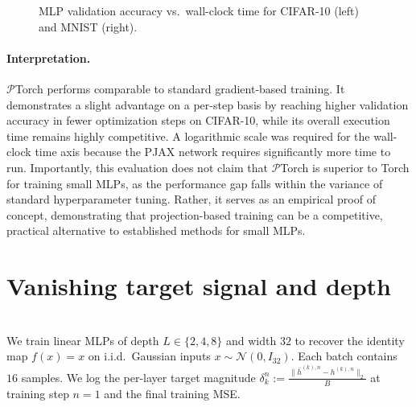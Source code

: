 \begin{figure}[ht]
\centering
\begin{minipage}[t]{0.47\textwidth}
    \centering
\end{minipage}
\hfill
\begin{minipage}[t]{0.47\textwidth}
    \centering
\end{minipage}
\caption{MLP validation accuracy vs.\ wall-clock time for CIFAR-10 (left) and MNIST (right).}
\label{fig:shallow-mlp-time}
\end{figure}

\paragraph{Interpretation.}
$\mathcal{P}$Torch performs comparable to standard gradient-based training. It demonstrates a slight advantage on a per-step basis by reaching higher validation accuracy in fewer optimization steps on CIFAR-10, while its overall execution time remains highly competitive. A logarithmic scale was required for the wall-clock time axis because the PJAX network requires significantly more time to run. Importantly, this evaluation does not claim that $\mathcal{P}$Torch is superior to Torch for training small MLPs, as the performance gap falls within the variance of standard hyperparameter tuning. Rather, it serves as an empirical proof of concept, demonstrating that projection-based training can be a competitive, practical alternative to established methods for small MLPs.%
\section{Vanishing target signal and depth}
\label{sec:exp-vanishing}
\begin{tcolorbox}[reprocard, title=Setup]\\
We train linear MLPs of depth $L \in \{2, 4, 8\}$ and width $32$ to recover the identity map $f(x) = x$ on i.i.d.\ Gaussian inputs $x \sim \mathcal{N}(0, I_{32})$. Each batch contains $16$ samples. We log the per-layer target magnitude $\delta_k^{n} := \frac{\|\bar h^{(k),n} - h^{(k),n}\|_2 }{B}$ at training step $n=1$ and the final training MSE.
\end{tcolorbox}


